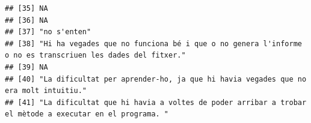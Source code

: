 \documentclass[
]{article}
\begin{document}
\begin{verbatim}
## [35] NA                                                                                                                                                                                                                                                                                                                                                                                                       
## [36] NA                                                                                                                                                                                                                                                                                                                                                                                                       
## [37] "no s'enten"                                                                                                                                                                                                                                                                                                                                                                                             
## [38] "Hi ha vegades que no funciona bé i que o no genera l'informe o no es transcriuen les dades del fitxer."                                                                                                                                                                                                                                                                                                 
## [39] NA                                                                                                                                                                                                                                                                                                                                                                                                       
## [40] "La dificultat per aprender-ho, ja que hi havia vegades que no era molt intuitiu."                                                                                                                                                                                                                                                                                                                       
## [41] "La dificultat que hi havia a voltes de poder arribar a trobar el mètode a executar en el programa. "                                                                                                                                                                                                                                                                                                    

\end{verbatim}
\end{document}
